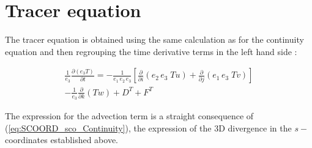 \documentclass[../main/NEMO_manual]{subfiles}
\begin{document}
\section{Tracer equation}
\label{sec:SCOORD_tracer}

The tracer equation is obtained using the same calculation as for the continuity equation and then
regrouping the time derivative terms in the left hand side :

\begin{multline}
  \label{eq:SCOORD_tracer}
  \frac{1}{e_3} \frac{\partial \left(  e_3 T  \right)}{\partial t}
  = -\frac{1}{e_1 \,e_2 \,e_3}
  \left[           \frac{\partial }{\partial i} \left( {e_2 \,e_3 \;Tu} \right)
    +   \frac{\partial }{\partial j} \left( {e_1 \,e_3 \;Tv} \right)               \right]       \\
  -  \frac{1}{e_3}  \frac{\partial }{\partial k} \left(                   Tw  \right)
  +  D^{T} +F^{T}
\end{multline}

The expression for the advection term is a straight consequence of (\autoref{eq:SCOORD_sco_Continuity}),
the expression of the 3D divergence in the $s-$coordinates established above.

\subinc{}
\end{document}

